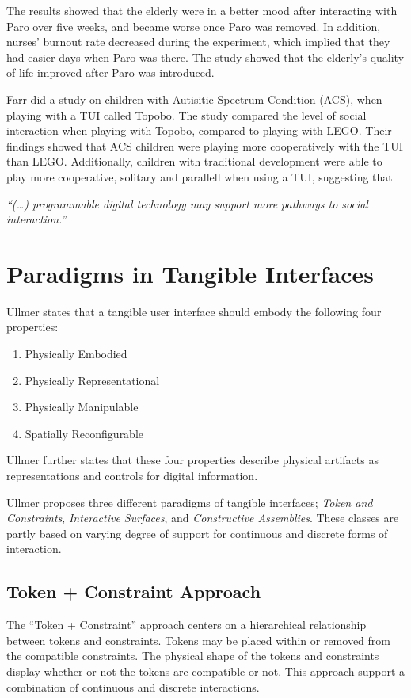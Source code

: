 The results showed that the elderly were in a better mood after interacting with Paro over five weeks, and became worse once Paro was removed. In addition, nurses' burnout rate decreased during the experiment, which implied that they had easier days when Paro was there. The study showed that the elderly's quality of life improved after Paro was introduced.           

Farr \etal{} did a study on children with Autisitic Spectrum Condition (ACS), when playing with a TUI called Topobo\cite{farr2010social}. The study compared the level of social interaction when playing with Topobo, compared to playing with LEGO. Their findings showed that ACS children were playing more cooperatively with the TUI than LEGO. Additionally, children with traditional development were able to play more cooperative, solitary and parallell when using a TUI, suggesting that 

\textit{``(\ldots) programmable digital technology may support more pathways to social interaction.''}

\section{Paradigms in Tangible Interfaces}
Ullmer states that a tangible user interface should embody the following four properties\cite{ullmer2002tangible}:

\begin{enumerate}
	\item{Physically Embodied}
	\item{Physically Representational}
	\item{Physically Manipulable}
	\item{Spatially Reconfigurable}
\end{enumerate}

Ullmer further states that these four properties describe physical artifacts as representations and controls for digital information. 

Ullmer proposes three different paradigms of tangible interfaces; \emph{Token and Constraints}, \emph{Interactive Surfaces}, and \emph{Constructive Assemblies}. These classes are partly based on varying degree of support for continuous and discrete forms of interaction\cite{ullmer2002tangible}.

\subsection{Token + Constraint Approach}
The ``Token + Constraint'' approach centers on a hierarchical relationship between tokens and constraints. Tokens may be placed within or removed from the compatible constraints. The physical shape of the tokens and constraints display whether or not the tokens are compatible or not. This approach support a combination of continuous and discrete interactions.

